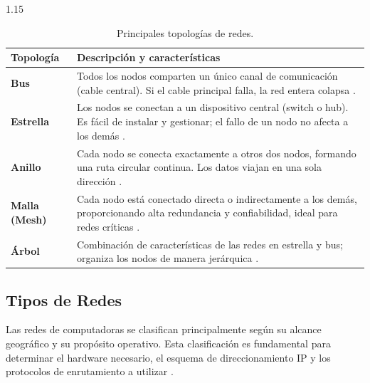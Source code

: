\documentclass[11pt, a4paper]{article}
\begin{document}
\begin{spacing}{1.15}
\begin{table}[H]
    \centering
    \renewcommand{\arraystretch}{1.35}
    \begin{tabular}{|p{3cm}|p{11.5cm}|}
        \hline
        \textbf{Topología} & \textbf{Descripción y características} \\ \hline
        \textbf{Bus} & Todos los nodos comparten un único canal de comunicación (cable central). Si el cable principal falla, la red entera colapsa \cite{tanenbaum2021}. \\ \hline
        \textbf{Estrella} & Los nodos se conectan a un dispositivo central (switch o hub). Es fácil de instalar y gestionar; el fallo de un nodo no afecta a los demás \cite{stallings2014}. \\ \hline
        \textbf{Anillo} & Cada nodo se conecta exactamente a otros dos nodos, formando una ruta circular continua. Los datos viajan en una sola dirección \cite{kurose2017}. \\ \hline
        \textbf{Malla (Mesh)} & Cada nodo está conectado directa o indirectamente a los demás, proporcionando alta redundancia y confiabilidad, ideal para redes críticas \cite{forouzan2013}. \\ \hline
        \textbf{Árbol} & Combinación de características de las redes en estrella y bus; organiza los nodos de manera jerárquica \cite{tanenbaum2021}. \\ \hline
    \end{tabular}
    \caption{Principales topologías de redes.}
\end{table}

\subsection{Tipos de Redes}
Las redes de computadoras se clasifican principalmente según su alcance geográfico y su propósito operativo. Esta clasificación es fundamental para determinar el hardware necesario, el esquema de direccionamiento IP y los protocolos de enrutamiento a utilizar \cite{kurose2017}.


\end{spacing}
\end{document}
